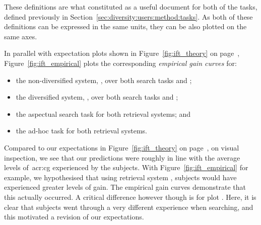 These definitions are what constituted as a useful document for both of the tasks, defined previously in Section~\ref{sec:diversity:users:method:tasks}. As both of these definitions can be expressed in the same units, they can be also plotted on the same axes.

In parallel with expectation plots shown in Figure~\ref{fig:ift_theory} on page~\pageref{fig:ift_theory}, Figure~\ref{fig:ift_empirical} plots the corresponding \emph{empirical gain curves} for:

\begin{itemize}
    \item[\genericblack{(a)}]{the non-diversified system, , over both search tasks  and ;}
    \item[\genericblack{(b)}]{the diversified system, , over both search tasks  and ;}
    \item[\genericblack{(c)}]{the aspectual search task  for both retrieval systems; and}
    \item[\genericblack{(d)}]{the ad-hoc task  for both retrieval systems.}
\end{itemize}

Compared to our expectations in Figure~\ref{fig:ift_theory} on page~\pageref{fig:ift_theory}, on visual inspection, we see that our predictions were roughly in line with the average levels of~\gls{acr:cg} experienced by the subjects. With Figure~\ref{fig:ift_empirical}  for example, we hypothesised that using retrieval system , subjects would have experienced greater levels of gain. The empirical gain curves demonstrate that this actually occurred. A critical difference however though is for plot . Here, it is clear that subjects went through a very different experience when searching, and this motivated a revision of our expectations.


